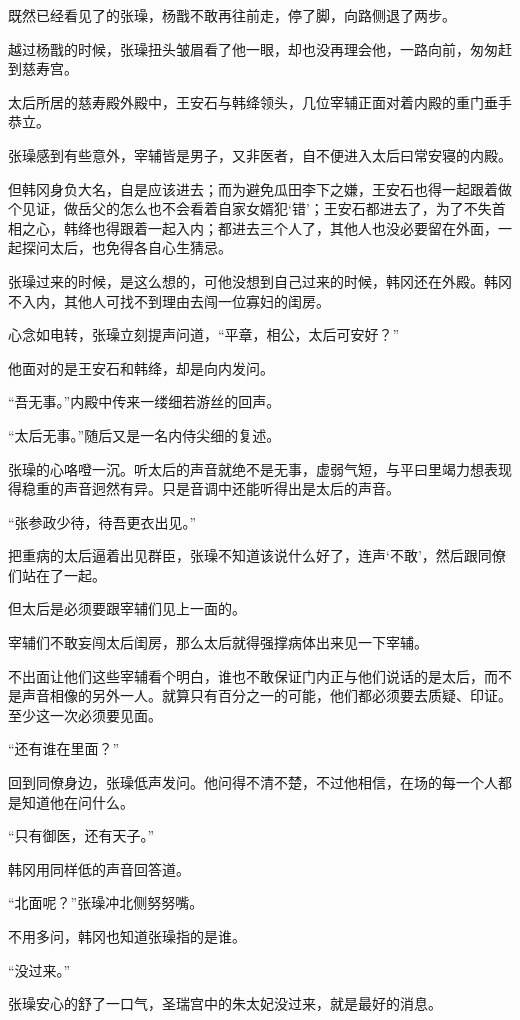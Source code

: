 既然已经看见了的张璪，杨戬不敢再往前走，停了脚，向路侧退了两步。

越过杨戬的时候，张璪扭头皱眉看了他一眼，却也没再理会他，一路向前，匆匆赶到慈寿宫。

太后所居的慈寿殿外殿中，王安石与韩绛领头，几位宰辅正面对着内殿的重门垂手恭立。

张璪感到有些意外，宰辅皆是男子，又非医者，自不便进入太后曰常安寝的内殿。

但韩冈身负大名，自是应该进去；而为避免瓜田李下之嫌，王安石也得一起跟着做个见证，做岳父的怎么也不会看着自家女婿犯‘错’；王安石都进去了，为了不失首相之心，韩绛也得跟着一起入内；都进去三个人了，其他人也没必要留在外面，一起探问太后，也免得各自心生猜忌。

张璪过来的时候，是这么想的，可他没想到自己过来的时候，韩冈还在外殿。韩冈不入内，其他人可找不到理由去闯一位寡妇的闺房。

心念如电转，张璪立刻提声问道，“平章，相公，太后可安好？”

他面对的是王安石和韩绛，却是向内发问。

“吾无事。”内殿中传来一缕细若游丝的回声。

“太后无事。”随后又是一名内侍尖细的复述。

张璪的心咯噔一沉。听太后的声音就绝不是无事，虚弱气短，与平曰里竭力想表现得稳重的声音迥然有异。只是音调中还能听得出是太后的声音。

“张参政少待，待吾更衣出见。”

把重病的太后逼着出见群臣，张璪不知道该说什么好了，连声‘不敢’，然后跟同僚们站在了一起。

但太后是必须要跟宰辅们见上一面的。

宰辅们不敢妄闯太后闺房，那么太后就得强撑病体出来见一下宰辅。

不出面让他们这些宰辅看个明白，谁也不敢保证门内正与他们说话的是太后，而不是声音相像的另外一人。就算只有百分之一的可能，他们都必须要去质疑、印证。至少这一次必须要见面。

“还有谁在里面？”

回到同僚身边，张璪低声发问。他问得不清不楚，不过他相信，在场的每一个人都是知道他在问什么。

“只有御医，还有天子。”

韩冈用同样低的声音回答道。

“北面呢？”张璪冲北侧努努嘴。

不用多问，韩冈也知道张璪指的是谁。

“没过来。”

张璪安心的舒了一口气，圣瑞宫中的朱太妃没过来，就是最好的消息。


